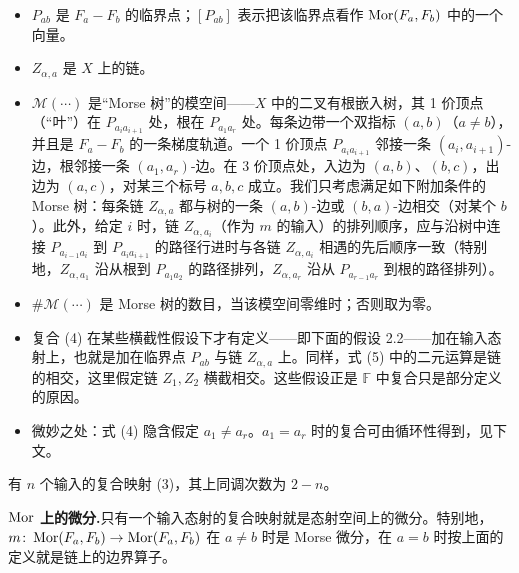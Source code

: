 \begin{itemize}
  \item $P_{ab}$ 是 $F_a-F_b$ 的临界点；$[P_{ab}]$ 表示把该临界点看作 $\operatorname{Mor}(F_a,F_b)$ 中的一个向量。
  \item $Z_{\alpha,a}$ 是 $X$ 上的链。
  \item $\mathcal M(\cdots)$ 是“Morse 树”的模空间——$X$ 中的二叉有根嵌入树，其 1 价顶点（“叶”）在 $P_{a_ia_{i+1}}$ 处，根在 $P_{a_1a_r}$ 处。每条边带一个双指标 $(a,b)$（$a\neq b$），并且是 $F_a-F_b$ 的一条梯度轨道。一个 1 价顶点 $P_{a_ia_{i+1}}$ 邻接一条 $(a_i,a_{i+1})$-边，根邻接一条 $(a_1,a_r)$-边。在 3 价顶点处，入边为 $(a,b)$、$(b,c)$，出边为 $(a,c)$，对某三个标号 $a,b,c$ 成立。我们只考虑满足如下附加条件的 Morse 树：每条链 $Z_{\alpha,a}$ 都与树的一条 $(a,b)$-边或 $(b,a)$-边相交（对某个 $b$）。此外，给定 $i$ 时，链 $Z_{\alpha,a_i}$（作为 $m$ 的输入）的排列顺序，应与沿树中连接 $P_{a_{i-1}a_i}$ 到 $P_{a_ia_{i+1}}$ 的路径行进时与各链 $Z_{\alpha,a_i}$ 相遇的先后顺序一致（特别地，$Z_{\alpha,a_1}$ 沿从根到 $P_{a_1a_2}$ 的路径排列，$Z_{\alpha,a_r}$ 沿从 $P_{a_{r-1}a_r}$ 到根的路径排列）。
  \item $\#\mathcal M(\cdots)$ 是 Morse 树的数目，当该模空间零维时；否则取为零。
  \item 复合 (4) 在某些横截性假设下才有定义——即下面的假设 2.2——加在输入态射上，也就是加在临界点 $P_{ab}$ 与链 $Z_{\alpha,a}$ 上。同样，式 (5) 中的二元运算是链的相交，这里假定链 $Z_1,Z_2$ 横截相交。这些假设正是 $\mathbb{F}$ 中复合只是部分定义的原因。
  \item 微妙之处：式 (4) 隐含假定 $a_1\neq a_r$。$a_1=a_r$ 时的复合可由循环性得到，见下文。
\end{itemize}

有 $n$ 个输入的复合映射 (3)，其上同调次数为 $2-n$。



\textbf{$\operatorname{Mor}$ 上的微分.}\quad 只有一个输入态射的复合映射就是态射空间上的微分。特别地，$m\colon\operatorname{Mor}(F_a,F_b)\to\operatorname{Mor}(F_a,F_b)$ 在 $a\neq b$ 时是 Morse 微分，在 $a=b$ 时按上面的定义就是链上的边界算子。

